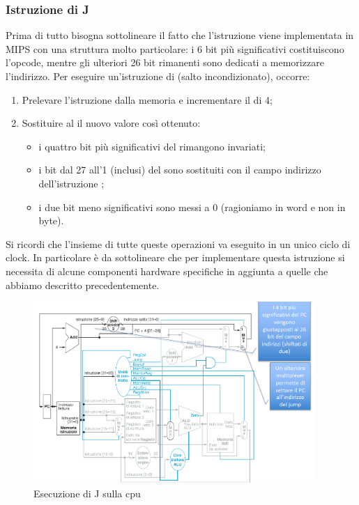 \documentclass[class=book, crop=false, oneside]{standalone}
\begin{document}
\subsubsection{Istruzione di J}
Prima di tutto bisogna sottolineare il fatto che l'istruzione  viene implementata in MIPS con una struttura molto particolare: i 6 bit più significativi costituiscono l'opcode, mentre gli ulteriori 26 bit rimanenti sono dedicati a memorizzare l'indirizzo. Per eseguire un'istruzione di  (salto incondizionato), occorre:
\begin{enumerate}
	\item Prelevare l’istruzione dalla memoria e incrementare il  di 4;
	\item Sostituire al  il nuovo valore così ottenuto:
	\begin{itemize}
		\item i quattro bit più significativi del  rimangono invariati;
		\item i bit dal 27 all'1 (inclusi) del  sono sostituiti con il campo indirizzo dell'istruzione ;
		\item i due bit meno significativi sono messi a 0 (ragioniamo in word e non in byte).
	\end{itemize}
\end{enumerate}
Si ricordi che l'insieme di tutte queste operazioni va eseguito in un unico ciclo di clock. In particolare è da sottolineare che per implementare questa istruzione si necessita di alcune componenti hardware specifiche in aggiunta a quelle che abbiamo descritto precedentemente.

\begin{figure}[H]
	\centering
	\includegraphics[width=0.95\textwidth,keepaspectratio]{es_j.png}
	\caption{Esecuzione di J sulla \acrshort{cpu}}
\end{figure}
\end{document}

